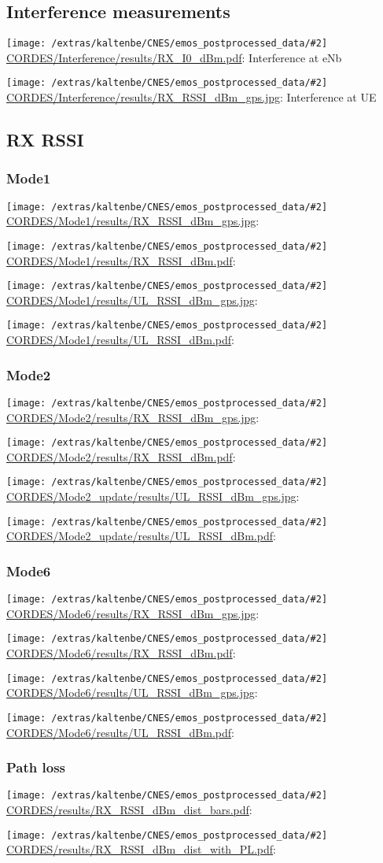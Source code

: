 \documentclass[a4paper,10pt]{article}
\newcommand{\printfile}[2][]{
 \begin{minipage}{8cm}
  \centering
  \texttt{[image: /extras/kaltenbe/CNES/emos\_postprocessed\_data/\#2]}
  \url{#2}: #1

 \end{minipage}
}
\begin{document}
\subsection{Interference measurements}

\printfile[Interference at eNb]{CORDES/Interference/results/RX_I0_dBm.pdf}
\printfile[Interference at UE]{CORDES/Interference/results/RX_RSSI_dBm_gps.jpg}


\subsection{RX RSSI}


%  

\subsubsection{Mode1}
\printfile{CORDES/Mode1/results/RX_RSSI_dBm_gps.jpg}
\printfile{CORDES/Mode1/results/RX_RSSI_dBm.pdf}

\printfile{CORDES/Mode1/results/UL_RSSI_dBm_gps.jpg}
\printfile{CORDES/Mode1/results/UL_RSSI_dBm.pdf}

\subsubsection{Mode2}

\printfile{CORDES/Mode2/results/RX_RSSI_dBm_gps.jpg}
\printfile{CORDES/Mode2/results/RX_RSSI_dBm.pdf}

\printfile{CORDES/Mode2_update/results/UL_RSSI_dBm_gps.jpg}
\printfile{CORDES/Mode2_update/results/UL_RSSI_dBm.pdf}

\subsubsection{Mode6}
\printfile{CORDES/Mode6/results/RX_RSSI_dBm_gps.jpg}
\printfile{CORDES/Mode6/results/RX_RSSI_dBm.pdf}

\printfile{CORDES/Mode6/results/UL_RSSI_dBm_gps.jpg}
\printfile{CORDES/Mode6/results/UL_RSSI_dBm.pdf}

\subsubsection{Path loss}
\printfile{CORDES/results/RX_RSSI_dBm_dist_bars.pdf}
\printfile{CORDES/results/RX_RSSI_dBm_dist_with_PL.pdf}
\end{document}
